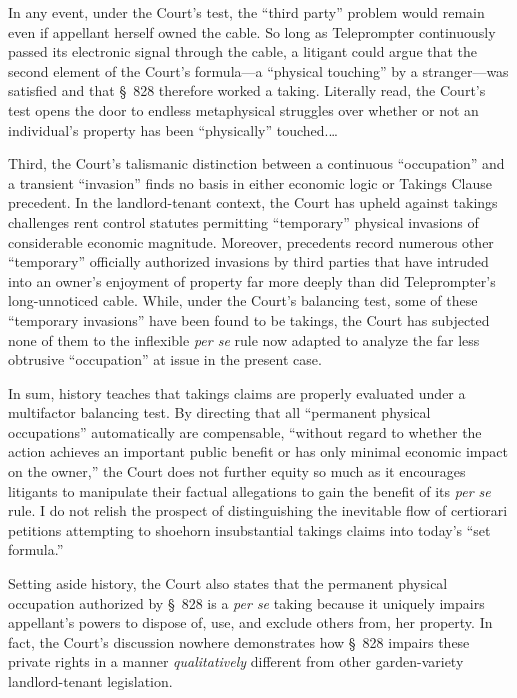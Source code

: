 In any event, under the Court's test, the ``third party'' problem would remain
even if appellant herself owned the cable. So long as Teleprompter continuously
passed its electronic signal through the cable, a litigant could argue that the
second element of the Court's formula---a ``physical touching'' by a
stranger---was satisfied and that \S~828 therefore worked a taking. Literally
read, the Court's test opens the door to endless metaphysical struggles over
whether or not an individual's property has been ``physically'' touched.\ldots

Third, the Court's talismanic distinction between a continuous ``occupation''
and a transient ``invasion'' finds no basis in either economic logic or Takings
Clause precedent. In the landlord-tenant context, the Court has upheld against
takings challenges rent control statutes permitting ``temporary'' physical
invasions of considerable economic magnitude. Moreover, precedents record
numerous other ``temporary'' officially authorized invasions by third parties
that have intruded into an owner's enjoyment of property far more deeply than
did Teleprompter's long-unnoticed cable. While, under the Court's balancing
test, some of these ``temporary invasions'' have been found to be takings, the
Court has subjected none of them to the inflexible \textit{per se} rule now
adapted to analyze the far less obtrusive ``occupation'' at issue in the present
case. 

In sum, history teaches that takings claims are properly evaluated under a
multifactor balancing test. By directing that all ``permanent physical
occupations'' automatically are compensable, ``without regard to whether the
action achieves an important public benefit or has only minimal economic impact
on the owner,'' the Court does not further equity so much as it encourages
litigants to manipulate their factual allegations to gain the benefit of its
\textit{per se} rule. I do not relish the prospect of distinguishing the
inevitable flow of certiorari petitions attempting to shoehorn insubstantial
takings claims into today's ``set formula.''

Setting aside history, the Court also states that the permanent physical
occupation authorized by \S~828 is a \textit{per se} taking because it uniquely
impairs appellant's powers to dispose of, use, and exclude others from, her
property. In fact, the Court's discussion nowhere demonstrates how \S~828
impairs these private rights in a manner \textit{qualitatively} different from
other garden-variety landlord-tenant legislation.

